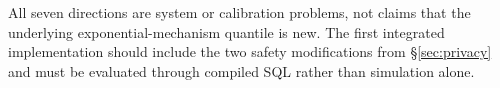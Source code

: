 \documentclass[11pt,a4paper]{article}
\begin{document}
All seven directions are system or calibration problems, not claims that the underlying
exponential-mechanism quantile is new. The first integrated implementation should include the two
safety modifications from \S\ref{sec:privacy} and must be evaluated through compiled SQL rather
than simulation alone.


\end{document}
